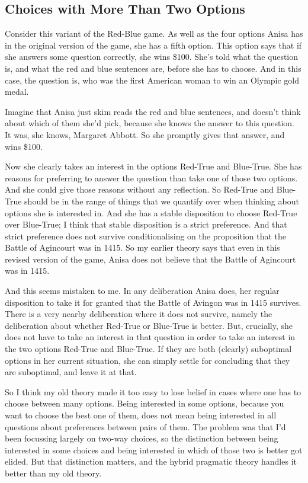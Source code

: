 \documentclass[
  11pt,
]{book}
\begin{document}
\hypertarget{threeway}{%
\subsection{Choices with More Than Two Options}\label{threeway}}

Consider this variant of the Red-Blue game. As well as the four options Anisa has in the original version of the game, she has a fifth option. This option says that if she answers some question correctly, she wins \$100. She's told what the question is, and what the red and blue sentences are, before she has to choose. And in this case, the question is, who was the first American woman to win an Olympic gold medal.

Imagine that Anisa just skim reads the red and blue sentences, and doesn't think about which of them she'd pick, because she knows the answer to this question. It was, she knows, Margaret Abbott. So she promptly gives that answer, and wins \$100.

Now she clearly takes an interest in the options Red-True and Blue-True. She has reasons for preferring to answer the question than take one of those two options. And she could give those reasons without any reflection. So Red-True and Blue-True should be in the range of things that we quantify over when thinking about options she is interested in. And she has a stable disposition to choose Red-True over Blue-True; I think that stable disposition is a strict preference. And that strict preference does not survive conditionalising on the proposition that the Battle of Agincourt was in 1415. So my earlier theory says that even in this revised version of the game, Anisa does not believe that the Battle of Agincourt was in 1415.

And this seems mistaken to me. In any deliberation Anisa does, her regular disposition to take it for granted that the Battle of Avingon was in 1415 survives. There is a very nearby deliberation where it does not survive, namely the deliberation about whether Red-True or Blue-True is better. But, crucially, she does not have to take an interest in that question in order to take an interest in the two options Red-True and Blue-True. If they are both (clearly) suboptimal options in her current situation, she can simply settle for concluding that they are suboptimal, and leave it at that.

So I think my old theory made it too easy to lose belief in cases where one has to choose between many options. Being interested in some options, because you want to choose the best one of them, does not mean being interested in all questions about preferences between pairs of them. The problem was that I'd been focussing largely on two-way choices, so the distinction between being interested in some choices and being interested in which of those two is better got elided. But that distinction matters, and the hybrid pragmatic theory handles it better than my old theory.
\end{document}
